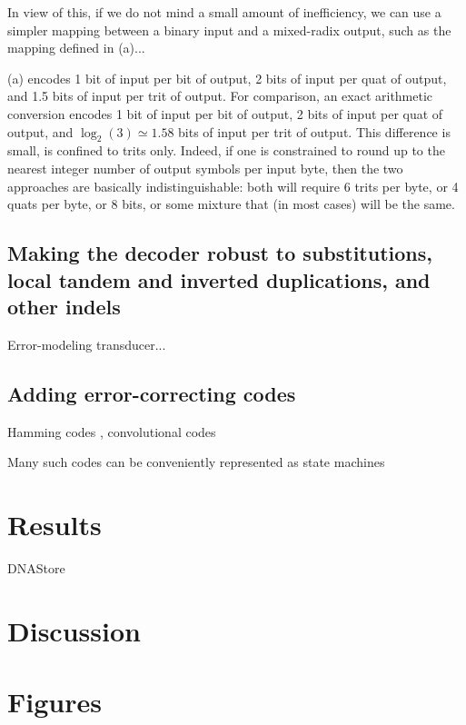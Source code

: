 \documentclass[english]{article}
\begin{document}
In view of this, if we do not mind a small amount of inefficiency,
we can use a simpler mapping between a binary input and a mixed-radix output,
such as the mapping defined in (a)...

(a)
encodes 1 bit of input per bit of output,
2 bits of input per quat of output,
and 1.5 bits of input per trit of output.
For comparison,
an exact arithmetic conversion
encodes 1 bit of input per bit of output,
2 bits of input per quat of output,
and $\log_2(3) \simeq 1.58$ bits of input per trit of output.
This difference is small, is confined to trits only.
Indeed, if one is constrained to round up to the nearest integer number of output symbols per input byte,
then the two approaches are basically indistinguishable:
both will require 6 trits per byte, or 4 quats per byte, or 8 bits, or some mixture that
(in most cases) will be the same. %



\subsection{Making the decoder robust to substitutions, local tandem and inverted duplications, and other indels}

Error-modeling transducer...

\subsection{Adding error-correcting codes}

Hamming codes , convolutional codes %

Many such codes can be conveniently represented as state machines

\section{Results}

DNAStore

\section{Discussion}



\newpage
\section{Figures}
\end{document}
